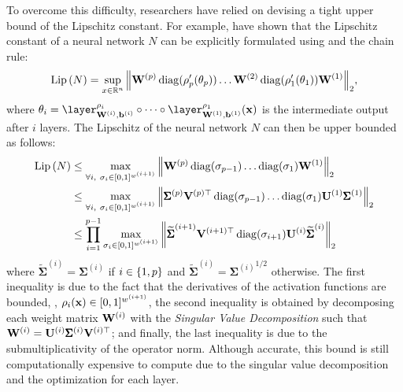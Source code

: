 

\noindent
To overcome this difficulty, researchers have relied on devising a tight upper bound of the Lipschitz constant.
For example, \citet{scaman2018lipschitz} have shown that the Lipschitz constant of a neural network $N$ can be explicitly formulated using  and the chain rule:
\begin{equation} \label{equation:ch3-decomposition_jacobian_lipschitz}
  \operatorname{Lip}{(N)} = \sup_{x \in \mathbb{R}^n} \norm{\mathbf{W}^{(p)} \operatorname*{diag}(\rho'_p(\theta_p)) \dots \mathbf{W}^{(2)} \operatorname*{diag}(\rho'_1(\theta_1)) \mathbf{W}^{(1)}}_2,
\end{equation}
where $\theta_i = \layer^{\act_i}_{\Wmat^{(i)}, \bvec^{(i)}} \circ \cdots \circ \layer^{\act_1}_{\Wmat^{(1)}, \bvec^{(1)}}(\xvec)$ is the intermediate output after $i$ layers.
The Lipschitz of the neural network $N$ can then be upper bounded as follows:
\begin{align}
  \operatorname{Lip}{(N)} &\leq \max_{\forall i,\ \sigma_i \in [0, 1]^{w^{(i+1)}}} \norm{\mathbf{W}^{(p)} \operatorname*{diag}(\sigma_{p-1}) \dots \operatorname*{diag}(\sigma_1) \mathbf{W}^{(1)}}_2 \notag \\
  &\leq \max_{\forall i,\ \sigma_i \in [0, 1]^{w^{(i+1)}}} \norm{ \pmb{\Sigma}^{(p)} \mathbf{V}^{(p)\top} \operatorname*{diag}(\sigma_{p-1}) \dots \operatorname*{diag}(\sigma_1) \mathbf{U}^{(1)} \pmb{\Sigma}^{(1)}}_2 \notag \\
  &\leq \prod_{i=1}^{p-1} \max_{\sigma_i \in [0, 1]^{w^{(i+1)}}} \norm{\widetilde{\pmb{\Sigma}}^{(i+1)} \mathbf{V}^{(i+1)\top} \operatorname*{diag}(\sigma_{i+1}) \mathbf{U}^{(i)} \widetilde{\pmb{\Sigma}}^{(i)}}_2 
\end{align}
where $\widetilde{\pmb{\Sigma}}^{(i)} = \pmb{\Sigma}^{(i)}$ if $i \in \{1, p\}$ and $\widetilde{\pmb{\Sigma}}^{(i)} = {\pmb{\Sigma}^{(i)}}^{1/2}$ otherwise.
The first inequality is due to the fact that the derivatives of the activation functions are bounded, \ie, $\rho_i(\mathbf{x}) \in [0, 1]^{w^{(i+1)}}$, the second inequality is obtained by decomposing each weight matrix $\mathbf{W}^{(i)}$ with the \emph{Singular Value Decomposition} such that $\mathbf{W}^{(i)} = \mathbf{U}^{(i)} \pmb{\Sigma}^{(i)} \mathbf{V}^{(i)\top}$; and finally, the last inequality is due to the submultiplicativity of the operator norm.
Although accurate, this bound is still computationally expensive to compute due to the singular value decomposition and the optimization for each layer. 
